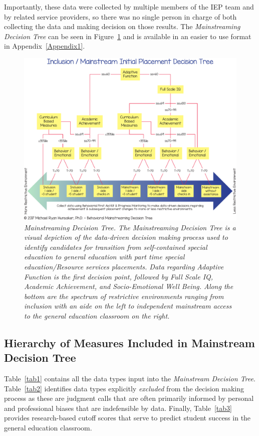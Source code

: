 \documentclass[twoside]{article}
\begin{document}
Importantly, these data were collected by multiple members of the IEP team and by related service providers, so there was no single person in charge of both collecting the data and making decision on those results. The \textit{Mainstreaming Decision Tree} can be seen in Figure~\ref{fig1} and is available in an easier to use format in Appendix~\ref{Appendix1}.
%
%
%
%
\begin{figure}[htp!]
\centering
\includegraphics[width=\textwidth]{Figure1.pdf}
\caption[Mainstreaming Decision Tree]{\textit{Mainstreaming Decision Tree. The Mainstreaming Decision Tree is a visual depiction of the data-driven decision making process used to identify candidates for transition from self-contained special education to general education with part time special education/Resource services placements. Data regarding Adaptive Function is the first decision point, followed by Full Scale IQ, Academic Achievement, and Socio-Emotional Well Being. Along the bottom are the spectrum of restrictive environments ranging from inclusion with an aide on the left to independent mainstream access to the general education classroom on the right.}}
\label{fig1}
\end{figure}
%
%
%
%
%
%
%
\subsection{Hierarchy of Measures Included in Mainstream Decision Tree}
Table~\ref{tab1} contains all the data types input into the \textit{Mainstream Decision Tree}. Table~\ref{tab2} identifies data types explicitly \textit{excluded} from the decision making process as these are judgment calls that are often primarily informed by personal and professional biases that are indefensible by data. Finally, Table~\ref{tab3} provides research-based cutoff scores that serve to predict student success in the general education classroom.
\end{document}
